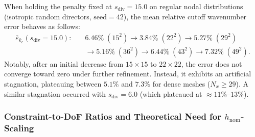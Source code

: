 \documentclass[preprint,12pt]{elsarticle}
\begin{document}
When holding the penalty fixed at $s_{\mathrm{div}} = 15.0$ on regular nodal distributions (isotropic random directors, $\text{seed}=42$), the mean relative cutoff wavenumber error behaves as follows:
\begin{equation}
    \begin{aligned}
        \overline{\varepsilon}_{k_c}(s_{\mathrm{div}}=15.0): \quad & 6.46\% \; (15^2) \longrightarrow 3.84\% \; (22^2) \longrightarrow 5.27\% \; (29^2)                  \\
                                                                   & \longrightarrow 5.16\% \; (36^2) \longrightarrow 6.44\% \; (43^2) \longrightarrow 7.32\% \; (49^2).
    \end{aligned}
\end{equation}
Notably, after an initial decrease from $15 \times 15$ to $22 \times 22$, the error does not converge toward zero under further refinement. Instead, it exhibits an artificial stagnation, plateauing between $5.1\%$ and $7.3\%$ for dense meshes ($N_x \ge 29$). A similar stagnation occurred with $s_{\mathrm{div}} = 6.0$ (which plateaued at $\approx 11\%\text{--}13\%$).

\subsubsection{Constraint-to-DoF Ratios and Theoretical Need for $h_{\mathrm{nom}}$-Scaling}
\label{subsubsec:constraint_ratio_scaling}
\end{document}
